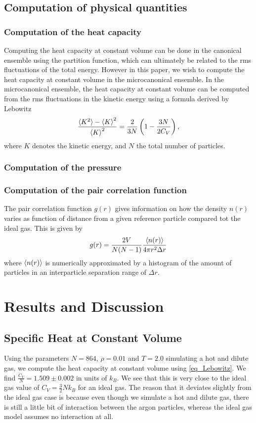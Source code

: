 \documentclass[twoside]{article}
\begin{document}
	
	\subsection{Computation of physical quantities}
	\subsubsection*{Computation of the heat capacity}
	Computing the heat capacity at constant volume can be done in the canonical ensemble using the partition function, which can ultimately be related to the rms fluctuations of the total energy. However in this paper, we wish to compute the heat capacity at constant volume in the microcanonical ensemble. In the microcanonical ensemble, the heat capacity at constant volume can be computed from the rms fluctuations in the kinetic energy using a formula derived by Lebowitz\cite{ref_Lebowitz}
	\begin{equation}
	\frac{\braket{K^2} - \braket{K}^2}{\braket{K}^2} = \frac{2}{3N} \left( 1 - \frac{3N}{2C_V} \right),
	\label{eq_Lebowitz}
	\end{equation}
	where $K$ denotes the kinetic energy, and $N$ the total number of particles. 
	\subsubsection* {Computation of the pressure}
	\subsubsection* {Computation of the pair correlation function}
	The pair correlation function $g(r)$  gives information on how the density $n(r)$ varies as function of distance from a given reference particle compared tot the ideal gas. This is given by 
	\begin{equation}\label{eq_correlation}
	g(r) = \frac{2V}{N(N-1)}\frac{\braket{n(r)}}{4\pi r^2 \Delta r}
	\end{equation}
	where $\braket{n(r)}$ is numerically approximated by a histogram of the amount of particles in an interparticle separation range of $\Delta r$. 
	
	
	
	
	\section{Results and Discussion}
	\subsection{Specific Heat at Constant Volume}
	Using the parameters $N=864$, $\rho=0.01$ and $T=2.0$ simulating a hot and dilute gas, we compute the heat capacity at constant volume using \eqref{eq_Lebowitz}. We find $\frac{C_V}{N} = 1.509  \pm 0.002 $ in units of $k_B$. We see that this is very close to the ideal gas value of $C_V = \frac{3}{2} N k_B$ for an ideal gas. The reason that it deviates slightly from the ideal gas case is because even though we simulate a hot and dilute gas, there is still a little bit of interaction between the argon particles, whereas the ideal gas model assumes no interaction at all.
	
\end{document}

